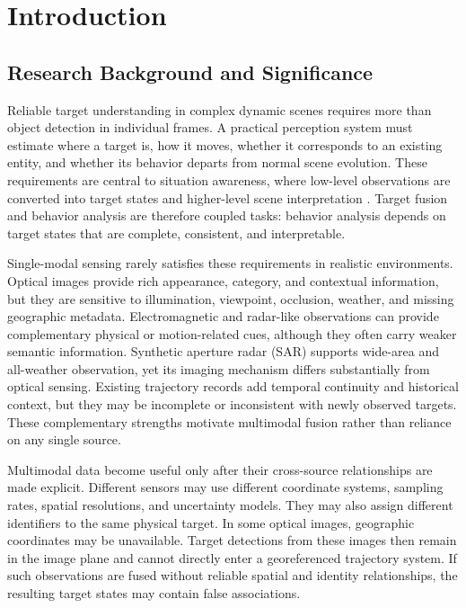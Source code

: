 \chapter{Introduction}

\section{Research Background and Significance}
Reliable target understanding in complex dynamic scenes requires more than object detection in individual frames. A practical perception system must estimate where a target is, how it moves, whether it corresponds to an existing entity, and whether its behavior departs from normal scene evolution. These requirements are central to situation awareness, where low-level observations are converted into target states and higher-level scene interpretation \cite{endsley1995situation,blasch2009blueprint}. Target fusion and behavior analysis are therefore coupled tasks: behavior analysis depends on target states that are complete, consistent, and interpretable.

Single-modal sensing rarely satisfies these requirements in realistic environments. Optical images provide rich appearance, category, and contextual information, but they are sensitive to illumination, viewpoint, occlusion, weather, and missing geographic metadata. Electromagnetic and radar-like observations can provide complementary physical or motion-related cues, although they often carry weaker semantic information. Synthetic aperture radar (SAR) supports wide-area and all-weather observation, yet its imaging mechanism differs substantially from optical sensing. Existing trajectory records add temporal continuity and historical context, but they may be incomplete or inconsistent with newly observed targets. These complementary strengths motivate multimodal fusion rather than reliance on any single source.

Multimodal data become useful only after their cross-source relationships are made explicit. Different sensors may use different coordinate systems, sampling rates, spatial resolutions, and uncertainty models. They may also assign different identifiers to the same physical target. In some optical images, geographic coordinates may be unavailable. Target detections from these images then remain in the image plane and cannot directly enter a georeferenced trajectory system. If such observations are fused without reliable spatial and identity relationships, the resulting target states may contain false associations.

